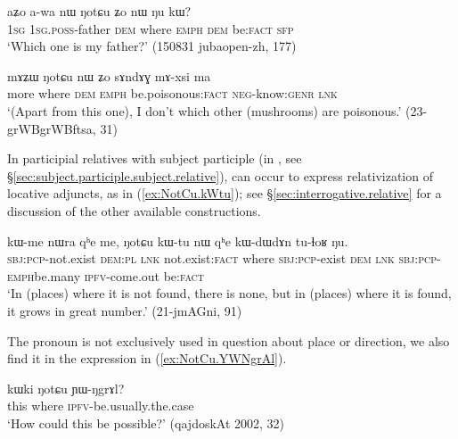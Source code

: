 \begin{exe}
\ex \label{ex:NotCu.Zo.nW}
\gll  aʑo a-wa nɯ ŋotɕu ʑo nɯ ŋu kɯ? \\
\textsc{1sg} \textsc{1sg}.\textsc{poss}-father \textsc{dem} where \textsc{emph} \textsc{dem} be:\textsc{fact} \textsc{sfp} \\
\glt `Which one is my father?' (150831 jubaopen-zh, 177)
\end{exe} 

\begin{exe}
\ex \label{ex:NotCu.nW.Zo.sAndAG}
\gll  mɤʑɯ ŋotɕu nɯ ʑo sɤndɤɣ mɤ-xsi ma \\
more where \textsc{dem} \textsc{emph} be.poisonous:\textsc{fact} \textsc{neg}-know:\textsc{genr} \textsc{lnk} \\
\glt `(Apart from this one), I don't which other (mushrooms) are poisonous.' (23-grWBgrWBftsa, 31)
\end{exe} 

In participial relatives with subject participle (in , see §\ref{sec:subject.participle.subject.relative}),  can occur to express relativization of locative adjuncts, as in  (\ref{ex:NotCu.kWtu}); see §\ref{sec:interrogative.relative} for a discussion of the other available constructions.

\begin{exe}
\ex \label{ex:NotCu.kWtu}
\gll kɯ-me nɯra qʰe me,  ŋotɕu kɯ-tu nɯ qʰe kɯ-dɯ\redp{}dɤn tu-ɬoʁ ŋu. \\
\textsc{sbj}:\textsc{pcp}-not.exist \textsc{dem}:\textsc{pl} \textsc{lnk} not.exist:\textsc{fact} where \textsc{sbj}:\textsc{pcp}-exist \textsc{dem} \textsc{lnk} \textsc{sbj}:\textsc{pcp}-\textsc{emph}\redp{}be.many \textsc{ipfv}-come.out be:\textsc{fact} \\
\glt `In (places) where it is not found, there is none, but in (places) where it is found, it grows in great number.' (21-jmAGni, 91)
\end{exe} 

The pronoun  is not exclusively used in question about place or direction, we also find it in the expression in (\ref{ex:NotCu.YWNgrAl}).

 \begin{exe}
\ex \label{ex:NotCu.YWNgrAl}
\gll  kɯki ŋotɕu ɲɯ-ŋgrɤl?   \\
 this where \textsc{ipfv}-be.usually.the.case \\
\glt `How could this be possible?'  (qajdoskAt 2002, 32)
\end{exe} 

